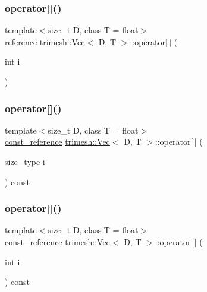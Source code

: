 \subsubsection{\texorpdfstring{operator[]()}{operator[]()}\hspace{0.1cm}{\footnotesize\ttfamily [2/4]}}
{\footnotesize\ttfamily template$<$size\+\_\+t D, class T = float$>$ \\
\hyperlink{classtrimesh_1_1Vec_ad76bb92c986524d251998d6eae7d2825}{reference} \hyperlink{classtrimesh_1_1Vec}{trimesh\+::\+Vec}$<$ D, T $>$\+::operator\mbox{[}$\,$\mbox{]} (\begin{DoxyParamCaption}\item[{int}]{i }\end{DoxyParamCaption})\hspace{0.3cm}{\ttfamily [inline]}}

\mbox{\label{classtrimesh_1_1Vec_a8013cd5d8a791e48775f57d721014f0b}} 
\subsubsection{\texorpdfstring{operator[]()}{operator[]()}\hspace{0.1cm}{\footnotesize\ttfamily [3/4]}}
{\footnotesize\ttfamily template$<$size\+\_\+t D, class T = float$>$ \\
\hyperlink{classtrimesh_1_1Vec_a5ae45a41f93e04534f46b74dee5c6701}{const\+\_\+reference} \hyperlink{classtrimesh_1_1Vec}{trimesh\+::\+Vec}$<$ D, T $>$\+::operator\mbox{[}$\,$\mbox{]} (\begin{DoxyParamCaption}\item[{\hyperlink{classtrimesh_1_1Vec_a65397e05ed96e7723cf2d54dfff0ad0a}{size\+\_\+type}}]{i }\end{DoxyParamCaption}) const\hspace{0.3cm}{\ttfamily [inline]}}

\mbox{\label{classtrimesh_1_1Vec_a214b07d98d292daa53353fb3fc955ad5}} 
\subsubsection{\texorpdfstring{operator[]()}{operator[]()}\hspace{0.1cm}{\footnotesize\ttfamily [4/4]}}
{\footnotesize\ttfamily template$<$size\+\_\+t D, class T = float$>$ \\
\hyperlink{classtrimesh_1_1Vec_a5ae45a41f93e04534f46b74dee5c6701}{const\+\_\+reference} \hyperlink{classtrimesh_1_1Vec}{trimesh\+::\+Vec}$<$ D, T $>$\+::operator\mbox{[}$\,$\mbox{]} (\begin{DoxyParamCaption}\item[{int}]{i }\end{DoxyParamCaption}) const\hspace{0.3cm}{\ttfamily [inline]}}

